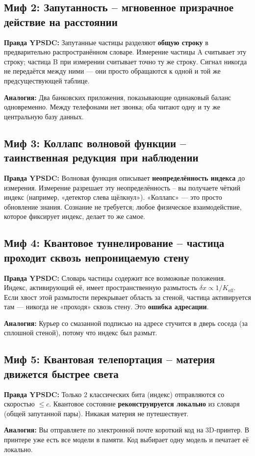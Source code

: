\documentclass[12pt,a4paper]{article}
\begin{document}
	\subsection{Миф 2: Запутанность – мгновенное призрачное действие на расстоянии}
	\textbf{Правда YPSDC:} Запутанные частицы разделяют \textbf{общую строку} в предварительно распространённом словаре. Измерение частицы A считывает эту строку; частица B при измерении считывает точно ту же строку. Сигнал никогда не передаётся между ними — они просто обращаются к одной и той же предсуществующей таблице.
	\par
	\textbf{Аналогия:} Два банковских приложения, показывающие одинаковый баланс одновременно. Между телефонами нет звонка; оба читают одну и ту же центральную базу данных.
	
	\subsection{Миф 3: Коллапс волновой функции – таинственная редукция при наблюдении}
	\textbf{Правда YPSDC:} Волновая функция описывает \textbf{неопределённость индекса} до измерения. Измерение разрешает эту неопределённость – вы получаете чёткий индекс (например, «детектор слева щёлкнул»). «Коллапс» — это просто обновление знания. Сознание не требуется; любое физическое взаимодействие, которое фиксирует индекс, делает то же самое.
	
	\subsection{Миф 4: Квантовое туннелирование – частица проходит сквозь непроницаемую стену}
	\textbf{Правда YPSDC:} Словарь частицы содержит все возможные положения. Индекс, активирующий её, имеет пространственную размытость \(\delta x \propto 1/K_{\mathrm{eff}}\). Если хвост этой размытости перекрывает область за стеной, частица активируется там — никогда не «проходя» сквозь стену. Это \textbf{ошибка адресации}.
	\par
	\textbf{Аналогия:} Курьер со смазанной подписью на адресе стучится в дверь соседа (за сплошной стеной), потому что индекс был размыт.
	
	\subsection{Миф 5: Квантовая телепортация – материя движется быстрее света}
	\textbf{Правда YPSDC:} Только 2 классических бита (индекс) отправляются со скоростью \(\le c\). Квантовое состояние \textbf{реконструируется локально} из словаря (общей запутанной пары). Никакая материя не путешествует.
	\par
	\textbf{Аналогия:} Вы отправляете по электронной почте короткий код на 3D‑принтер. В принтере уже есть все модели в памяти. Код выбирает одну модель и печатает её локально.
	
\end{document}
